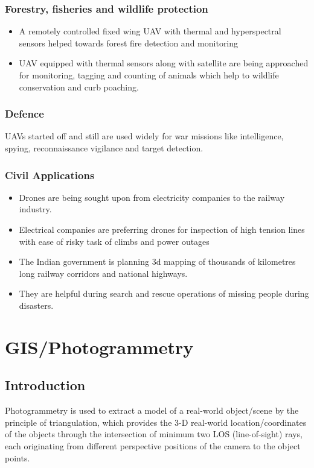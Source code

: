 \documentclass[11pt,twocolumn,letterpaper]{article}
\begin{document}
\subsubsection{Forestry, fisheries and wildlife protection}
\begin{itemize}
    \item A remotely controlled fixed wing UAV with thermal and hyperspectral sensors helped towards forest fire detection and monitoring
    \item UAV equipped with thermal sensors along with satellite are being approached for
monitoring, tagging and counting of animals which help to wildlife conservation and curb poaching.
\end{itemize}
\subsubsection{Defence}
UAVs started off and still are used widely for war missions like intelligence, spying, reconnaissance vigilance and target detection.

\subsubsection{Civil Applications }
\begin{itemize}
    \item Drones are being sought upon from electricity companies to the railway industry. 
    \item Electrical companies are preferring drones for inspection of high tension lines with ease of risky task of climbs and power outages
    \item The Indian government is
    planning 3d mapping of thousands of kilometres long railway corridors and national highways.
    \item They are helpful during search and
    rescue operations of missing people during disasters.
\end{itemize}


\section{GIS/Photogrammetry}
\subsection{Introduction}
Photogrammetry is used to extract a model of a real-world object/scene by the principle of triangulation, which provides the 3-D real-world location/coordinates of the objects through the intersection of minimum two LOS (line-of-sight) rays, each originating from different perspective positions of the camera to the object points. 
\end{document}
